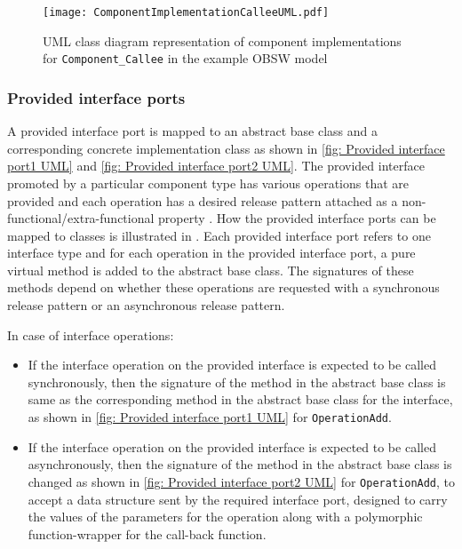\begin{figure}[h]
	\centering
	\texttt{[image: ComponentImplementationCalleeUML.pdf]}
	\caption{UML class diagram representation of component implementations for \texttt{Component\_\allowbreak Callee} in the example OBSW model}
	\label{fig: Component implementation Callee UML}
\end{figure}

\subsubsection{\textbf{Provided interface ports}}
A provided interface port is mapped to an abstract base class and a corresponding concrete implementation class as shown in \cref{fig: Provided interface port1 UML} and \cref{fig: Provided interface port2 UML}. The provided interface promoted by a particular component type has various operations that are provided and each operation has a desired release pattern attached as a non-functional/extra-functional property \cite{SpecMetamodel}\cite{CompBasedProcess}. How the provided interface ports can be mapped to classes is illustrated in \cite{CBSEExample}. Each provided interface port refers to one interface type and for each operation in the provided interface port, a pure virtual method is added to the abstract base class. The signatures of these methods depend on whether these operations are requested with a synchronous release pattern or an asynchronous release pattern.

\newpage
In case of interface operations:
\begin{itemize}
\item If the interface operation on the provided interface is expected to be called synchronously, then the signature of the method in the abstract base class is same as the corresponding method in the abstract base class for the interface, as shown in \cref{fig: Provided interface port1 UML} for \texttt{OperationAdd}.
\item If the interface operation on the provided interface is expected to be called asynchronously, then the signature of the method in the abstract base class is changed as shown in \cref{fig: Provided interface port2 UML} for \texttt{OperationAdd}, to accept a data structure sent by the required interface port, designed to carry the values of the parameters for the operation along with a polymorphic function-wrapper for the call-back function.     
\end{itemize}   

